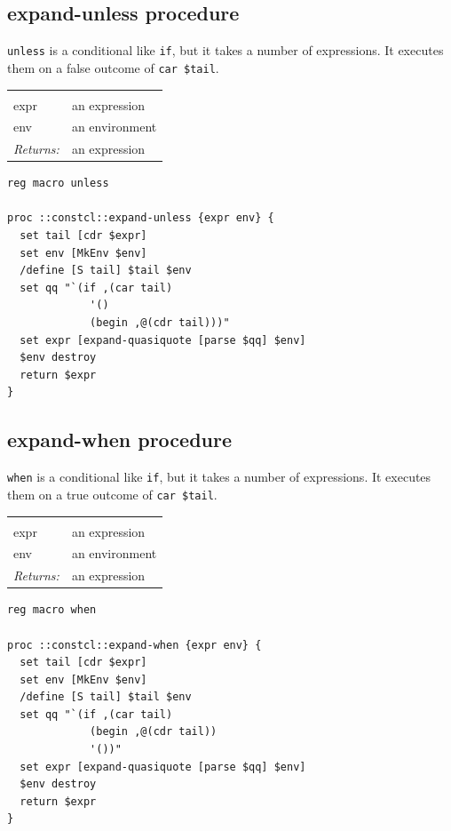 \documentclass[twoside]{report}
\begin{document}
\subsection{expand-unless procedure}
\label{expandunless-procedure}

\texttt{unless} is a conditional like \texttt{if}, but it takes a number of expressions. It executes them on a false outcome of \texttt{car \$tail}.

\noindent\begin{tabular}{ |p{1.9cm} p{8cm}| }
\hline
\rowcolor[HTML]{CCCCCC} \multicolumn{2}{|l|}{\bf expand-unless (internal)} \\
expr & an expression \\
env & an environment \\
\textit{Returns:} & an expression \\
\hline
\end{tabular}

\begin{lstlisting}
reg macro unless

proc ::constcl::expand-unless {expr env} {
  set tail [cdr $expr]
  set env [MkEnv $env]
  /define [S tail] $tail $env
  set qq "`(if ,(car tail)
             '()
             (begin ,@(cdr tail)))"
  set expr [expand-quasiquote [parse $qq] $env]
  $env destroy
  return $expr
}
\end{lstlisting}

\subsection{expand-when procedure}
\label{expandwhen-procedure}

\texttt{when} is a conditional like \texttt{if}, but it takes a number of expressions. It executes them on a true outcome of \texttt{car \$tail}.

\noindent\begin{tabular}{ |p{1.9cm} p{8cm}| }
\hline
\rowcolor[HTML]{CCCCCC} \multicolumn{2}{|l|}{\bf expand-when (internal)} \\
expr & an expression \\
env & an environment \\
\textit{Returns:} & an expression \\
\hline
\end{tabular}

\begin{lstlisting}
reg macro when

proc ::constcl::expand-when {expr env} {
  set tail [cdr $expr]
  set env [MkEnv $env]
  /define [S tail] $tail $env
  set qq "`(if ,(car tail)
             (begin ,@(cdr tail))
             '())"
  set expr [expand-quasiquote [parse $qq] $env]
  $env destroy
  return $expr
}
\end{lstlisting}
\end{document}
